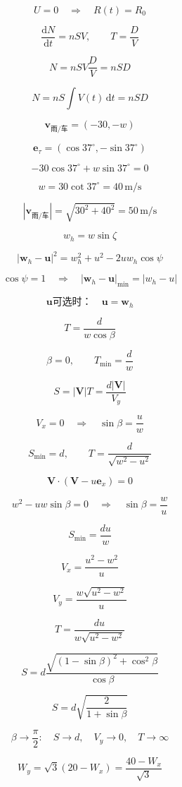 \documentclass[12pt]{article}
\begin{document}
\[
U=0\quad\Longrightarrow\quad R(t)=R_0
\]

\[
\frac{\mathrm dN}{\mathrm dt}=nSV,\qquad T=\frac DV
\]

\[
\boxed{N=nSV\frac DV=nSD}
\]

\[
N=nS\int V(t)\,\mathrm dt=nSD
\]

\[
\bm v_{\text{雨/车}}=(-30,-w)
\]

\[
\bm e_\tau=(\cos37^\circ,-\sin37^\circ)
\]

\[
-30\cos37^\circ+w\sin37^\circ=0
\]

\[
\boxed{w=30\cot37^\circ=40\,\mathrm{m/s}}
\]

\[
|\bm v_{\text{雨/车}}|=\sqrt{30^2+40^2}=50\,\mathrm{m/s}
\]

\[
w_h=w\sin\zeta
\]

\[
|\bm w_h-\bm u|^2=w_h^2+u^2-2uw_h\cos\psi
\]

\[
\cos\psi=1\quad\Longrightarrow\quad |\bm w_h-\bm u|_{\min}=|w_h-u|
\]

\[
\bm u\text{可选时：}\quad\boxed{\bm u=\bm w_h}
\]

\[
T=\frac d{w\cos\beta}
\]

\[
\boxed{\beta=0,\qquad T_{\min}=\frac dw}
\]

\[
S=|\bm V|T=\frac{d|\bm V|}{V_y}
\]

\[
V_x=0\quad\Longrightarrow\quad\sin\beta=\frac uw
\]

\[
\boxed{S_{\min}=d},\qquad T=\frac d{\sqrt{w^2-u^2}}
\]

\[
\bm V\cdot(\bm V-u\bm e_x)=0
\]

\[
w^2-uw\sin\beta=0\quad\Longrightarrow\quad\sin\beta=\frac wu
\]

\[
\boxed{S_{\min}=\frac{du}{w}}
\]

\[
V_x=\frac{u^2-w^2}{u}
\]

\[
V_y=\frac{w\sqrt{u^2-w^2}}{u}
\]

\[
T=\frac{du}{w\sqrt{u^2-w^2}}
\]

\[
S=d\frac{\sqrt{(1-\sin\beta)^2+\cos^2\beta}}{\cos\beta}
\]

\[
S=d\sqrt{\frac2{1+\sin\beta}}
\]

\[
\beta\to\frac\pi2:\quad S\to d,\quad V_y\to0,\quad T\to\infty
\]

\[
W_y=\sqrt3(20-W_x)=\frac{40-W_x}{\sqrt3}
\]
\end{document}

